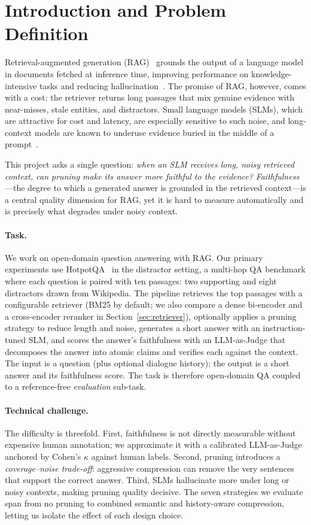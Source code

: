 \documentclass[runningheads]{llncs}
\begin{document}
\section{Introduction and Problem Definition}

Retrieval-augmented generation (RAG)~\cite{lewis2020rag} grounds the output of
a language model in documents fetched at inference time, improving performance
on knowledge-intensive tasks and reducing
hallucination~\cite{shuster2021retrieval}. The promise of RAG, however, comes
with a cost: the retriever returns long passages that mix genuine evidence with
near-misses, stale entities, and distractors. Small language models (SLMs),
which are attractive for cost and latency, are especially sensitive to such
noise, and long-context models are known to underuse evidence buried in the
middle of a prompt~\cite{liu2024lost}.

This project asks a single question: \emph{when an SLM receives long, noisy
retrieved context, can pruning make its answer more faithful to the evidence?}
\emph{Faithfulness}---the degree to which a generated answer is grounded in the
retrieved context---is a central quality dimension for RAG, yet it is hard to
measure automatically and is precisely what degrades under noisy context.

\paragraph{Task.}
We work on open-domain question answering with RAG. Our primary experiments use
HotpotQA~\cite{yang2018hotpotqa} in the distractor setting, a multi-hop QA
benchmark where each question is paired with ten passages: two supporting and
eight distractors drawn from Wikipedia. The pipeline retrieves the top
passages with a configurable retriever (BM25 by default; we also compare a
dense bi-encoder and a cross-encoder reranker in Section~\ref{sec:retriever}),
optionally applies a pruning strategy to reduce length and
noise, generates a short answer with an instruction-tuned SLM, and scores the
answer's faithfulness with an LLM-as-Judge that decomposes the answer into
atomic claims and verifies each against the context. The input is a question
(plus optional dialogue history); the output is a short answer and its
faithfulness score. The task is therefore open-domain QA coupled to a
reference-free \emph{evaluation} sub-task.

\paragraph{Technical challenge.}
The difficulty is threefold. First, faithfulness is not directly measurable
without expensive human annotation; we approximate it with a calibrated
LLM-as-Judge~\cite{es2023ragas} anchored by Cohen's $\kappa$ against human
labels. Second, pruning introduces a \emph{coverage--noise trade-off}:
aggressive compression can remove the very sentences that support the correct
answer. Third, SLMs hallucinate more under long or noisy contexts, making
pruning quality decisive. The seven strategies we evaluate span from no pruning
to combined semantic and history-aware compression, letting us isolate the
effect of each design choice.
\end{document}
